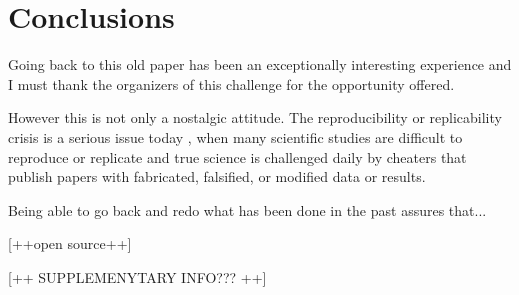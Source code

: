  

\section{Conclusions}

Going back to this old paper has been an exceptionally interesting experience and I must thank the organizers of this challenge for the opportunity offered.

However this is not only a nostalgic attitude. The reproducibility or replicability crisis is a serious issue today \cite{Miyakawa:2020}, when many scientific studies are difficult to reproduce or replicate and  true science is challenged daily by cheaters that publish papers with fabricated, falsified, or modified data or results.

Being able to go back and redo what has been done in the past assures that...

[++open source++]

[++ SUPPLEMENYTARY INFO??? ++]



%
%





